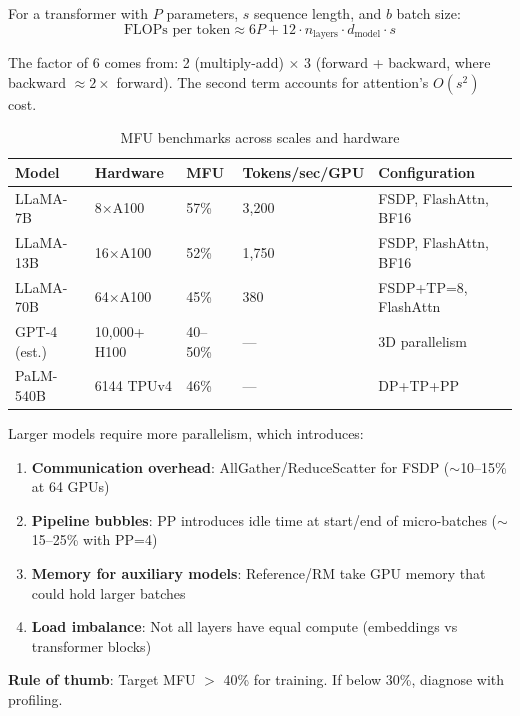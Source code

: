 For a transformer with $P$ parameters, $s$ sequence length, and $b$ batch size: 
\begin{equation}
\text{FLOPs per token} \approx 6P + 12 \cdot n_\text{layers} \cdot d_\text{model} \cdot s
\end{equation}

The factor of 6 comes from: 2 (multiply-add) $\times$ 3 (forward + backward, where backward $\approx 2\times$ forward). The second term accounts for attention’s $O(s^2)$ cost.

\begin{table}[ht!]
\centering
\caption{MFU benchmarks across scales and hardware}
\begin{tabular}{@{}lp{3cm}p{3.2cm}p{3.2cm}p{3.5cm}@{}}
\toprule
\textbf{Model} & \textbf{Hardware} & \textbf{MFU} & \textbf{Tokens/sec/GPU} & \textbf{Configuration} \\
\midrule
LLaMA-7B & 8$\times$A100 & 57\% & 3,200 & FSDP, FlashAttn, BF16 \\
LLaMA-13B & 16$\times$A100 & 52\% & 1,750 & FSDP, FlashAttn, BF16 \\
LLaMA-70B & 64$\times$A100 & 45\% & 380 & FSDP+TP=8, FlashAttn \\
GPT-4 (est.) & 10,000+ H100 & 40--50\% & --- & 3D parallelism \\
PaLM-540B & 6144 TPUv4 & 46\% & --- & DP+TP+PP \\
\bottomrule
\end{tabular}
\end{table}

\begin{intuitionbox}
Larger models require more parallelism, which introduces:

\begin{enumerate}
  \item \textbf{Communication overhead}: AllGather/ReduceScatter for FSDP ($\sim$10--15\% at 64 GPUs)
  \item \textbf{Pipeline bubbles}: PP introduces idle time at start/end of micro-batches ($\sim$15--25\% with PP=4)
  \item \textbf{Memory for auxiliary models}: Reference/RM take GPU memory that could hold larger batches
  \item \textbf{Load imbalance}: Not all layers have equal compute (embeddings vs transformer blocks)
\end{enumerate}

\textbf{Rule of thumb}: Target MFU $>$ 40\% for training. If below 30\%, diagnose with profiling.
\end{intuitionbox}

